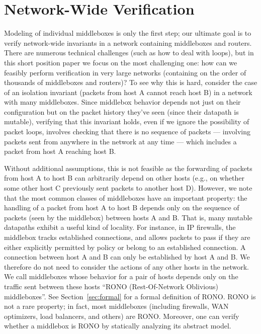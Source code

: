 \section{Network-Wide Verification}
\label{sec:modelnet}

Modeling of individual middleboxes is only the first step; our ultimate goal is to verify network-wide invariants in a network containing middleboxes and routers.
There are numerous technical challenges (such as how to deal with loops), but in this short position paper we focus on the most challenging one: how can we feasibly perform verification in very large networks (containing on the order of thousands of middleboxes and routers)? To see why this is hard, consider the case of an isolation invariant (packets from host A cannot reach host B) in a network with many middleboxes. Since middlebox behavior depends not just on their configuration but on the packet history they've seen (since their datapath is mutable), verifying that this invariant holds, even if we ignore the possibility of packet loops,
involves checking that there is no sequence of packets --- involving packets sent from anywhere in the network at any time --- which includes a packet from host A reaching host B.


Without additional assumptions, this is not feasible as the forwarding of packets from host A to host B can arbitrarily depend on other hosts (e.g., on whether some other host C previously sent packets to another host D). However, we note that the most common classes of middleboxes have an important property: the handling of a packet from host A to host B depends only on the sequence of packets (seen by the middlebox) between hosts A and B. That is, many mutable datapaths exhibit a useful kind of locality.
For instance, in IP
firewalls, the middlebox tracks established connections, and allows packets to pass if they are either explicitly permitted by
policy or belong to an established connection. A connection between host A and B can only be established by host A and B. We therefore do not need to consider the
actions of any other hosts in the network. We call middleboxes whose behavior for a pair of hosts depends only on the traffic sent between these hosts ``RONO (Rest-Of-Network Oblivious) middleboxes''. See Section~\ref{sec:formal} for a formal definition of RONO. RONO is not a rare property; in fact, most middleboxes (including firewalls, WAN optimizers, load balancers, and others) are RONO.  Moreover, one can verify whether a middlebox is RONO by statically analyzing its abstract model.


